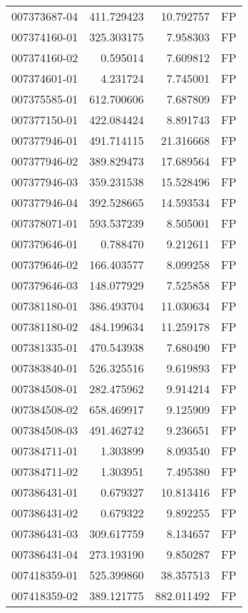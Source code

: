 \begin{tabular}{lrrl}
007373687-04 &  411.729423 &    10.792757 &   FP \\
007374160-01 &  325.303175 &     7.958303 &   FP \\
007374160-02 &    0.595014 &     7.609812 &   FP \\
007374601-01 &    4.231724 &     7.745001 &   FP \\
007375585-01 &  612.700606 &     7.687809 &   FP \\
007377150-01 &  422.084424 &     8.891743 &   FP \\
007377946-01 &  491.714115 &    21.316668 &   FP \\
007377946-02 &  389.829473 &    17.689564 &   FP \\
007377946-03 &  359.231538 &    15.528496 &   FP \\
007377946-04 &  392.528665 &    14.593534 &   FP \\
007378071-01 &  593.537239 &     8.505001 &   FP \\
007379646-01 &    0.788470 &     9.212611 &   FP \\
007379646-02 &  166.403577 &     8.099258 &   FP \\
007379646-03 &  148.077929 &     7.525858 &   FP \\
007381180-01 &  386.493704 &    11.030634 &   FP \\
007381180-02 &  484.199634 &    11.259178 &   FP \\
007381335-01 &  470.543938 &     7.680490 &   FP \\
007383840-01 &  526.325516 &     9.619893 &   FP \\
007384508-01 &  282.475962 &     9.914214 &   FP \\
007384508-02 &  658.469917 &     9.125909 &   FP \\
007384508-03 &  491.462742 &     9.236651 &   FP \\
007384711-01 &    1.303899 &     8.093540 &   FP \\
007384711-02 &    1.303951 &     7.495380 &   FP \\
007386431-01 &    0.679327 &    10.813416 &   FP \\
007386431-02 &    0.679322 &     9.892255 &   FP \\
007386431-03 &  309.617759 &     8.134657 &   FP \\
007386431-04 &  273.193190 &     9.850287 &   FP \\
007418359-01 &  525.399860 &    38.357513 &   FP \\
007418359-02 &  389.121775 &   882.011492 &   FP \\

\end{tabular}
